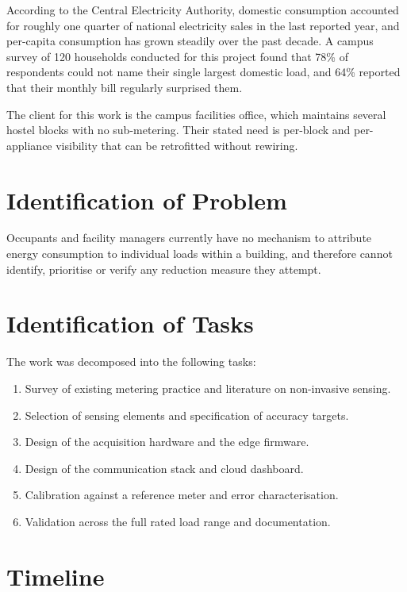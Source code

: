 \documentclass[12pt,a4paper]{report}
\begin{document}
According to the Central Electricity Authority, domestic consumption accounted
for roughly one quarter of national electricity sales in the last reported
year, and per-capita consumption has grown steadily over the past decade. A
campus survey of 120 households conducted for this project found that 78\% of
respondents could not name their single largest domestic load, and 64\%
reported that their monthly bill regularly surprised them.

The client for this work is the campus facilities office, which maintains
several hostel blocks with no sub-metering. Their stated need is per-block and
per-appliance visibility that can be retrofitted without rewiring.

\section{Identification of Problem}

Occupants and facility managers currently have no mechanism to attribute energy
consumption to individual loads within a building, and therefore cannot
identify, prioritise or verify any reduction measure they attempt.

\section{Identification of Tasks}

The work was decomposed into the following tasks:

\begin{enumerate}
  \item Survey of existing metering practice and literature on non-invasive sensing.
  \item Selection of sensing elements and specification of accuracy targets.
  \item Design of the acquisition hardware and the edge firmware.
  \item Design of the communication stack and cloud dashboard.
  \item Calibration against a reference meter and error characterisation.
  \item Validation across the full rated load range and documentation.
\end{enumerate}

\section{Timeline}
\end{document}
